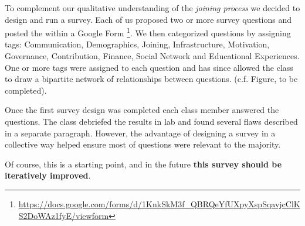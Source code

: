 To complement our qualitative understanding of the {\it joining process} we decided to design and run a survey. 
Each of us proposed two or more survey questions and posted the within a 
Google Form \footnote{\url{https://docs.google.com/forms/d/1KnkSkM3f_QBRQeYfUXpyXspSqavjcClKS2DoWAz1fyE/viewform}}. 
We then categorized questions by assigning tags: Communication, Demographics, Joining, Infrastructure, Motivation,
Governance, Contribution, Finance, Social Network and Educational Experiences. One or more tags were assigned to each question 
and has since allowed the class to draw a bipartite network of relationships between questions.
(c.f. Figure, to be completed).

Once the first survey design was completed each class member answered the questions. The class debriefed the results in lab and 
found several flaws described in a separate paragraph. However, the advantage of designing a survey in a collective way helped 
ensure most of questions were relevant to the majority. 

Of course, this is a starting point, and in the future {\bf this survey should be iteratively improved}.


